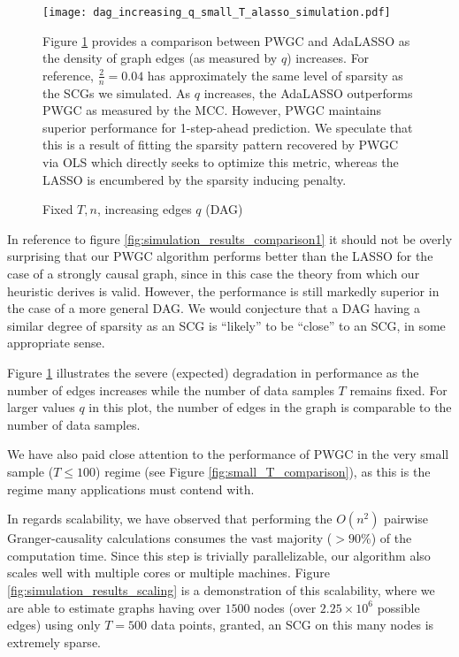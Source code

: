 \documentclass{statsoc}
\begin{document}
\begin{figure}
  \caption{Fixed $T, n$, increasing edges $q$ (DAG)}
  \label{fig:simulation_results_dense}
  \texttt{[image: dag\_increasing\_q\_small\_T\_alasso\_simulation.pdf]}

  {\footnotesize Figure \ref{fig:simulation_results_dense} provides a
    comparison between PWGC and AdaLASSO as the density of graph edges
    (as measured by $q$) increases.  For reference,
    $\frac{2}{n} = 0.04$ has approximately the same level of sparsity
    as the SCGs we simulated.  As $q$ increases, the AdaLASSO
    outperforms PWGC as measured by the MCC.  However, PWGC maintains
    superior performance for 1-step-ahead prediction.  We speculate
    that this is a result of fitting the sparsity pattern recovered by
    PWGC via OLS which directly seeks to optimize this metric, whereas
    the LASSO is encumbered by the sparsity inducing penalty.}
\end{figure}

In reference to figure \ref{fig:simulation_results_comparison1} it
should not be overly surprising that our PWGC algorithm performs
better than the LASSO for the case of a strongly causal graph, since
in this case the theory from which our heuristic derives is valid.
However, the performance is still markedly superior in the case of a
more general DAG.  We would conjecture that a DAG having a similar
degree of sparsity as an SCG is ``likely'' to be ``close'' to an SCG,
in some appropriate sense.

Figure \ref{fig:simulation_results_dense} illustrates the severe
(expected) degradation in performance as the number of edges increases
while the number of data samples $T$ remains fixed.  For larger values
$q$ in this plot, the number of edges in the graph is comparable to
the number of data samples.

We have also paid close attention to the performance of PWGC in the
very small sample ($T \le 100$) regime (see Figure
\ref{fig:small_T_comparison}), as this is the regime many applications
must contend with.

In regards scalability, we have observed that performing the $O(n^2)$
pairwise Granger-causality calculations consumes the vast majority
($> 90\%$) of the computation time.  Since this step is trivially
parallelizable, our algorithm also scales well with multiple cores or
multiple machines.  Figure \ref{fig:simulation_results_scaling} is a
demonstration of this scalability, where we are able to estimate
graphs having over $1500$ nodes (over $2.25 \times 10 ^6$ possible edges)
using only $T = 500$ data points, granted, an SCG on this many nodes
is extremely sparse.

\clearpage

\end{document}
